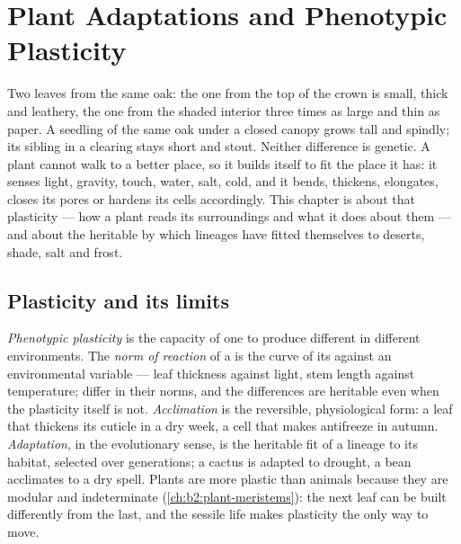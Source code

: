 \chapter{Plant Adaptations and Phenotypic Plasticity}\label{ch:b2:plant-plasticity}

Two leaves from the same oak: the one from the top of the crown is
small, thick and leathery, the one from the shaded interior three
times as large and thin as paper. A seedling of the same oak under a
closed canopy grows tall and spindly; its sibling in a clearing stays
short and stout. Neither difference is genetic. A plant cannot walk
to a better place, so it builds itself to fit the place it has: it
senses light, gravity, touch, water, salt, cold, and it bends,
thickens, elongates, closes its pores or hardens its cells
accordingly. This chapter is about that plasticity --- how a plant
reads its surroundings and what it does about them --- and about
the heritable  by which lineages have fitted themselves
to deserts, shade, salt and frost.

\section{Plasticity and its limits}

\begin{definition}\label{def:b2:plant-plasticity:plasticity}
\emph{Phenotypic plasticity} is the capacity of one  to
produce different  in different environments. The
\emph{norm of reaction} of a  is the curve of its 
against an environmental variable --- leaf thickness against light,
stem length against temperature;  differ in their norms,
and the differences are heritable even when the plasticity itself
is not. \emph{Acclimation} is the reversible, physiological form:
a leaf that thickens its cuticle in a dry week, a cell that makes
antifreeze in autumn. \emph{Adaptation}, in the evolutionary sense,
is the heritable fit of a lineage to its habitat, selected over
generations; a cactus is adapted to drought, a bean acclimates to a
dry spell. Plants are more plastic than animals because they are
modular and indeterminate (\cref{ch:b2:plant-meristems}): the next
leaf can be built differently from the last, and the sessile life
makes plasticity the only way to move.
\end{definition}


